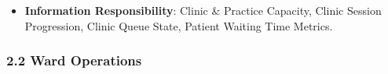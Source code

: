 \begin{itemize}
\begin{itemize}
\begin{itemize}
\end{itemize}


\item 
\textbf{Feature: Operational Queue Progression}:


\begin{itemize}

\item 
\emph{Function}: \texttt{} — Tracks patient arrival, rooming, consultation in-progress, and check-out states.



\item 
\emph{Exposed Service}: \texttt{} — Discloses real-time clinic waiting times and queue states.



\item 
\emph{Governed Process}: \textbf{Clinic /\allowbreak{} Operational Queue Progression Process}.



\end{itemize}


\end{itemize}


\item 
\textbf{Information Responsibility}: Clinic \& Practice Capacity, Clinic Session Progression, Clinic Queue State, Patient Waiting Time Metrics.



\end{itemize}
\label{rad:hso:87}

\par\smallskip
{}\label{rad:hso:89}
\subsubsection*{2.2 Ward Operations}
\label{rad:hso:90}

